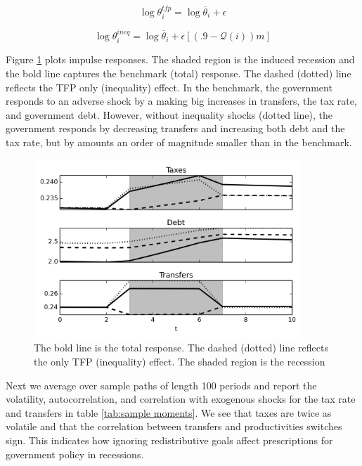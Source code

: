 \documentclass[thmsb,11pt]{article}
\begin{document}
\begin{equation*}
\log \theta^{tfp}_i=\log \overline{\theta}_i+\epsilon
\end{equation*}

\begin{equation*}
 \log \theta^{ineq}_i=\log \overline{\theta}_i+\epsilon [(.9-\mathcal{Q}(i))m]
\end{equation*}

Figure \ref{fig: irf} plots impulse responses. The shaded region is the induced recession and the bold line captures the benchmark (total) response. The dashed (dotted) line
reflects the TFP only  (inequality) effect.
In the benchmark, the government responds to an adverse shock by a making big increases in transfers, the  tax rate, and  government debt. However, without inequality shocks (dotted line), the government
responds by decreasing transfers and  increasing both debt and
the tax rate, but by  amounts an order of magnitude smaller than in the benchmark.
{
  \begin{figure}
  \label{fig: irf}
    \centering
    \includegraphics[width = 0.9\textwidth]{cesplots/irf_bm_chi_shocks.png}
    \caption{The bold line is the total response. The dashed (dotted) line reflects the only TFP (inequality) effect. The shaded region is the recession}
  \end{figure}

}
Next we average over sample paths of length 100 periods and report the volatility, autocorrelation, and correlation with exogenous shocks for the  tax rate
and transfers in table \ref{tab:sample moments}. We see that taxes are twice as volatile and that the correlation between transfers and productivities switches sign.
This  indicates how ignoring redistributive goals affect  prescriptions for government
policy in recessions.
\end{document}
